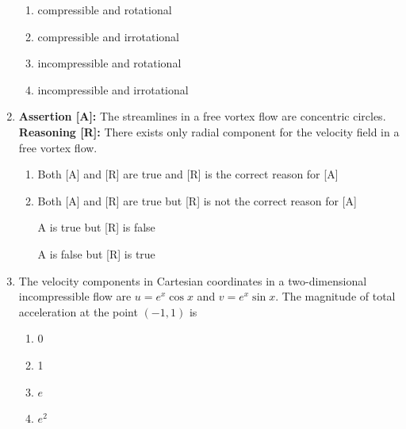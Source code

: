 \documentclass[journal,12pt,onecolumn]{IEEEtran}
\begin{document}
\begin{enumerate}[label=\arabic*)]
\vspace{0.2cm}
\begin{enumerate}[label=\alph*)]
\item compressible and rotational
\item compressible and irrotational
\item incompressible and rotational
\item incompressible and irrotational
\end{enumerate}

\vspace{0.5cm}

\item \textbf{Assertion [A]:} The streamlines in a free vortex flow are concentric circles. \\
\textbf{Reasoning [R]:} There exists only radial component for the velocity field in a free vortex flow.
\vspace{0.2cm}
\hfill{} \\

\begin{enumerate}[label=\alph*)]
\item Both [A] and [R] are true and [R] is the correct reason for [A]
\item Both [A] and [R] are true but [R] is not the correct reason for [A]
\item [A] is true but [R] is false
\item [A] is false but [R] is true
\end{enumerate}

\vspace{0.5cm}

\item The velocity components in Cartesian coordinates in a two-dimensional incompressible flow are $u=e^{x}\cos x$ and $v=e^{x}\sin x$. The magnitude of total acceleration at the point $(-1,1)$ is
\hfill{} \\

\vspace{0.2cm}
\begin{enumerate}[label=\alph*)]
\item 0
\item 1
\item $e$
\item $e^2$
\end{enumerate}

\vspace{0.3cm}


\end{enumerate}
\end{document}
